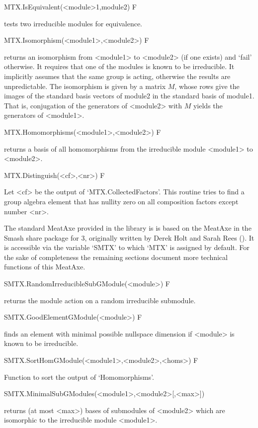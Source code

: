 \>MTX.IsEquivalent(<module>1,module2) F

tests two irreducible modules for equivalence.

\>MTX.Isomorphism(<module1>,<module2>) F

returns an isomorphism from <module1> to <module2> (if one exists) and 
`fail' otherwise. It requires that one of the modules is known to be
irreducible. It implicitly assumes that the same group is acting, otherwise
the results are unpredictable.
The isomorphism is given by a matrix $M$, whose rows give the images of the
standard basis vectors of module2 in the standard basis of module1. That is,
conjugation of the generators of <module2> with $M$ yields the
generators of <module1>.

\>MTX.Homomorphisms(<module1>,<module2>) F

returns a basis of all homomorphisms from the irreducible module 
<module1> to <module2>.

\>MTX.Distinguish(<cf>,<nr>) F

Let <cf> be the output of `MTX.CollectedFactors'. This routine
tries to find a group algebra element that has nullity zero on all
composition factors except number <nr>.


The standard MeatAxe provided in the {\GAP} library is
is based on the MeatAxe in the {\sf Smash} share
package for {\GAP}3, originally written by Derek Holt and Sarah Rees
(\cite{HR94}). It is
accessible via the variable `SMTX' to which `MTX' is assigned by default. 
For the sake of completeness the remaining sections document more technical
functions of this MeatAxe.

\>SMTX.RandomIrreducibleSubGModule(<module>) F

returns the module action on a random irreducible submodule.

\>SMTX.GoodElementGModule(<module>) F

finds an element with minimal possible nullspace dimension if <module>
is known to be irreducible.

\>SMTX.SortHomGModule(<module1>,<module2>,<homs>) F

Function to sort the output of `Homomorphisms'.

\>SMTX.MinimalSubGModules(<module1>,<module2>[,<max>])

returns (at most <max>) bases of submodules of <module2> which are
isomorphic to the irreducible module  <module1>.

